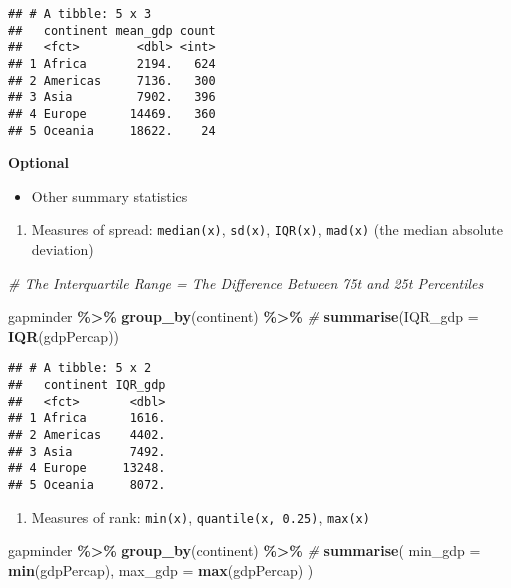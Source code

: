 \documentclass[
]{book}
\newenvironment{Shaded}{\begin{snugshade}}{\end{snugshade}}
\newcommand{\CommentTok}[1]{\textcolor[rgb]{0.56,0.35,0.01}{\textit{#1}}}
\newcommand{\DataTypeTok}[1]{\textcolor[rgb]{0.13,0.29,0.53}{#1}}
\newcommand{\KeywordTok}[1]{\textcolor[rgb]{0.13,0.29,0.53}{\textbf{#1}}}
\newcommand{\NormalTok}[1]{#1}
\newcommand{\OperatorTok}[1]{\textcolor[rgb]{0.81,0.36,0.00}{\textbf{#1}}}
\newcommand{\StringTok}[1]{\textcolor[rgb]{0.31,0.60,0.02}{#1}}
\providecommand{\tightlist}{%
  \setlength{\itemsep}{0pt}\setlength{\parskip}{0pt}}
\begin{document}
\begin{verbatim}
## # A tibble: 5 x 3
##   continent mean_gdp count
##   <fct>        <dbl> <int>
## 1 Africa       2194.   624
## 2 Americas     7136.   300
## 3 Asia         7902.   396
## 4 Europe      14469.   360
## 5 Oceania     18622.    24
\end{verbatim}

\textbf{Optional}

\begin{itemize}
\tightlist
\item
  Other summary statistics
\end{itemize}

\begin{enumerate}
\def\labelenumi{\arabic{enumi}.}
\tightlist
\item
  Measures of spread: \texttt{median(x)}, \texttt{sd(x)}, \texttt{IQR(x)}, \texttt{mad(x)} (the median absolute deviation)
\end{enumerate}

\begin{Shaded}
\begin{Highlighting}[]
\CommentTok{\# The Interquartile Range = The Difference Between 75t and 25t Percentiles}

\NormalTok{gapminder }\OperatorTok{\%\textgreater{}\%}
\StringTok{  }\KeywordTok{group\_by}\NormalTok{(continent) }\OperatorTok{\%\textgreater{}\%}\StringTok{ }\CommentTok{\#}
\StringTok{  }\KeywordTok{summarise}\NormalTok{(}\DataTypeTok{IQR\_gdp =} \KeywordTok{IQR}\NormalTok{(gdpPercap))}
\end{Highlighting}
\end{Shaded}

\begin{verbatim}
## # A tibble: 5 x 2
##   continent IQR_gdp
##   <fct>       <dbl>
## 1 Africa      1616.
## 2 Americas    4402.
## 3 Asia        7492.
## 4 Europe     13248.
## 5 Oceania     8072.
\end{verbatim}

\begin{enumerate}
\def\labelenumi{\arabic{enumi}.}
\setcounter{enumi}{1}
\tightlist
\item
  Measures of rank: \texttt{min(x)}, \texttt{quantile(x,\ 0.25)}, \texttt{max(x)}
\end{enumerate}

\begin{Shaded}
\begin{Highlighting}[]
\NormalTok{gapminder }\OperatorTok{\%\textgreater{}\%}
\StringTok{  }\KeywordTok{group\_by}\NormalTok{(continent) }\OperatorTok{\%\textgreater{}\%}\StringTok{ }\CommentTok{\#}
\StringTok{  }\KeywordTok{summarise}\NormalTok{(}
    \DataTypeTok{min\_gdp =} \KeywordTok{min}\NormalTok{(gdpPercap),}
    \DataTypeTok{max\_gdp =} \KeywordTok{max}\NormalTok{(gdpPercap)}
\NormalTok{  )}
\end{Highlighting}
\end{Shaded}
\end{document}
